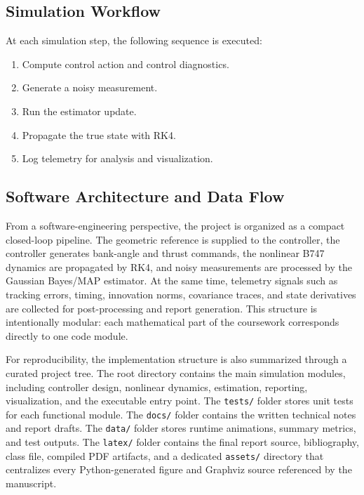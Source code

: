 \documentclass{Academic}
\begin{document}
\subsection{Simulation Workflow}

At each simulation step, the following sequence is executed:
\begin{enumerate}
\item Compute control action and control diagnostics.
\item Generate a noisy measurement.
\item Run the estimator update.
\item Propagate the true state with RK4.
\item Log telemetry for analysis and visualization.
\end{enumerate}

\subsection{Software Architecture and Data Flow}

From a software-engineering perspective, the project is organized as a compact closed-loop pipeline. The geometric reference is supplied to the controller, the controller generates bank-angle and thrust commands, the nonlinear B747 dynamics are propagated by RK4, and noisy measurements are processed by the Gaussian Bayes/MAP estimator. At the same time, telemetry signals such as tracking errors, timing, innovation norms, covariance traces, and state derivatives are collected for post-processing and report generation. This structure is intentionally modular: each mathematical part of the coursework corresponds directly to one code module.

For reproducibility, the implementation structure is also summarized through a curated project tree. The root directory contains the main simulation modules, including controller design, nonlinear dynamics, estimation, reporting, visualization, and the executable entry point. The \texttt{tests/} folder stores unit tests for each functional module. The \texttt{docs/} folder contains the written technical notes and report drafts. The \texttt{data/} folder stores runtime animations, summary metrics, and test outputs. The \texttt{latex/} folder contains the final report source, bibliography, class file, compiled PDF artifacts, and a dedicated \texttt{assets/} directory that centralizes every Python-generated figure and Graphviz source referenced by the manuscript.
\end{document}
